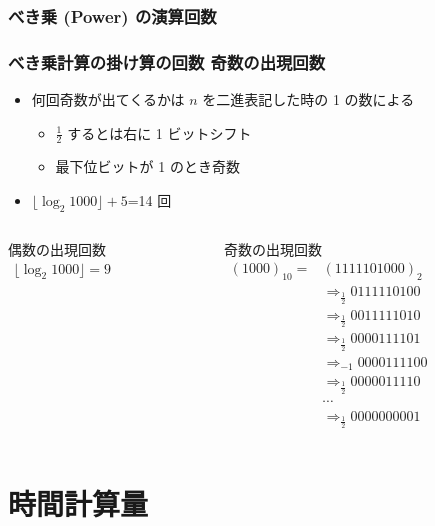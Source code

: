 \begin{frame}
\frametitle{べき乗 (Power) の演算回数}
\frametitle{べき乗計算の掛け算の回数 \textemdash 奇数の出現回数}
  \begin{itemize}
\item 何回奇数が出てくるかは $n$ を二進表記した時の 1 の数による
    \begin{itemize}
\item \(\frac{1}{2}\) するとは右に 1 ビットシフト
\item 最下位ビットが 1 のとき奇数
    \end{itemize}
\item \(\lfloor\log_2 1000\rfloor+5\)=14 回
  \end{itemize}
  \begin{columns}
    \begin{column}{0.45\textwidth}
      \begin{block}{偶数の出現回数}
        \begin{math}
          \begin{array}{c}
\lfloor\log_2 1000\rfloor = 9
          \end{array}
        \end{math}
      \end{block}
    \end{column}
    \begin{column}{0.5\textwidth}
      \begin{block}{奇数の出現回数}
\scriptsize
        \begin{math}
          \begin{array}{cl}
(1000)_{10}=&(1111101000)_{2}\\
&\Rightarrow_{\frac{1}{2}}0111110100\\
&\Rightarrow_{\frac{1}{2}}0011111010\\
&\Rightarrow_{\frac{1}{2}}0000111101\\
&\Rightarrow_{-1}0000111100\\
&\Rightarrow_{\frac{1}{2}}0000011110\\
&\cdots\\
&\Rightarrow_{\frac{1}{2}}0000000001
          \end{array}
        \end{math}
      \end{block}
    \end{column}
  \end{columns}
\end{frame}
\section{時間計算量}

